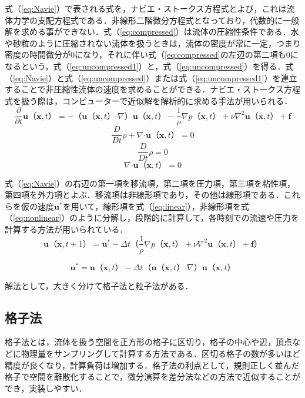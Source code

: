\documentclass[a4j,12pt]{jreport}
\begin{document}
式（\ref{eq:Navie}）で表される式を，ナビエ・ストークス方程式とよび，これは流体力学の支配方程式である．非線形二階微分方程式となっており，代数的に一般解を求める事ができない．式（\ref{eq:compressed}）は流体の圧縮性条件である．水や砂粒のように圧縮されない流体を扱うときは，流体の密度が常に一定，つまり密度の時間微分が0になり，それに伴い式（\ref{eq:compressed}の左辺の第二項も0になるという，式（\ref{eq:uncompressed1}）と，式（\ref{eq:uncompressed}）を得る．式（\ref{eq:Navie}）と式（\ref{eq:uncompressed}）または式（\ref{eq:uncompressed1}）を連立することで非圧縮性流体の速度を求めることができる．ナビエ・ストークス方程式を扱う際は，コンピューターで近似解を解析的に求める手法が用いられる．
\begin{equation}\label{eq:Navie}
\frac{\partial}{\partial t}\bm{u}（\bm{x},t） = -（\bm{u}（\bm{x},t） \boldsymbol{\cdot}\nabla）\bm{u}（\bm{x},t）  - \frac{1}{\rho}\nabla p（\bm{x},t） + \nu\nabla^2\bm{u}（\bm{x},t） + \bm{f}
\end{equation}
\begin{equation}\label{eq:compressed}
\frac{D}{Dt}\rho + \nabla\boldsymbol{\cdot}\bm{u}（\bm{x},t） = 0
\end{equation}
\begin{equation}\label{eq:uncompressed1}
\frac{D}{Dt}\rho  = 0
\end{equation}
\begin{equation}\label{eq:uncompressed}
\nabla\boldsymbol{\cdot}\bm{u}（\bm{x},t） = 0
\end{equation}

式（\ref{eq:Navie}）の右辺の第一項を移流項，第二項を圧力項，第三項を粘性項，第四項を外力項とよぶ．移流項は非線形項であり，その他は線形項である．これらを仮の速度$\bm{u}^*$を用いて，線形項を式（\ref{eq:linear}），非線形項を式（\ref{eq:nonlinear}）のように分解し，段階的に計算して，各時刻での流速や圧力を計算する方法が用いられている．
\begin{equation}\label{eq:linear}
\bm{u}（\bm{x},t+1） =  \bm{u}^* - \varDelta t（\frac{1}{\rho}\nabla p（\bm{x},t） + \nu\nabla^2\bm{u}（\bm{x},t） + \bm{f}）
\end{equation} 

\begin{equation}\label{eq:nonlinear}
\bm{u}^* = \bm{u}（\bm{x},t） - \varDelta t（\bm{u}（\bm{x},t） \boldsymbol{\cdot}\nabla）\bm{u}（\bm{x},t） 
\end{equation}

解法として，大きく分けて格子法と粒子法がある．

\subsection{格子法} \label{subsec:grid}
格子法とは，流体を扱う空間を正方形の格子に区切り，格子の中心や辺，頂点などに物理量をサンプリングして計算する方法である．区切る格子の数が多いほど精度が良くなり，計算負荷は増加する．格子法の利点として，規則正しく並んだ格子で空間を離散化することで，微分演算を差分法などの方法で近似することができ，実装しやすい．
\end{document}
